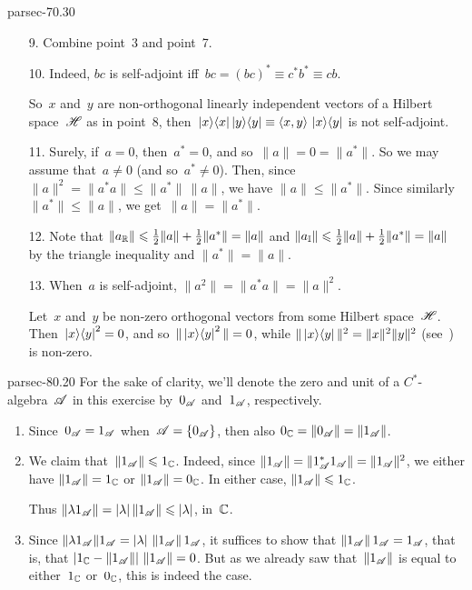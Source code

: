 \documentclass[b5page]{book}
\begin{document}
\begin{solution}{parsec-70.30}
\begin{enumerate}
\item[9.]
Combine point~3 and point~7.

\item[10.]
Indeed, $bc$ is self-adjoint
iff~$bc=(bc)^*\equiv c^*b^*\equiv cb$.

So~$x$ and~$y$ are non-orthogonal linearly independent vectors
of a Hilbert space~$\mathscr{H}$ as in point~8,
then~$\left|x\right>\!\left<x\right|\left|y\right>\!\left<y\right|\equiv \left<x,y\right>\,\left|x\right>\!\left<y\right|$
is not self-adjoint.

\item[11.]
Surely, if~$a=0$,
then~$a^*=0$, and so~$\|a\|=0=\|a^*\|$.
So we may assume that~$a\neq 0$
(and so~$a^*\neq 0$).
Then, since~$\|a\|^2=\|a^*a\|\leq \|a^*\|\,\|a\|$,
we have $\|a\|\leq \|a^*\|$.
Since similarly $\|a^*\|\leq \|a\|$,
we get~$\|a\|=\|a^*\|$.

\item[12.]
Note that
$\|a_{\mathbb{R}}\|\leqslant
\frac{1}{2}\|a\|+\frac{1}{2}\|a^*\|
= \|a\|$
and $\|a_{\mathbb{I}}\|\leqslant
\frac{1}{2}\|a\| + \frac{1}{2}\|a^*\|
= \|a\|$
by the triangle inequality and $\|a^*\|=\|a\|$.

\item[13.]
When~$a$ is self-adjoint,
$\|a^2\| = \|a^*a\| = \|a\|^2$.

Let~$x$ and~$y$ be non-zero orthogonal vectors
from some Hilbert space~$\mathscr{H}$.
Then~$\left|x\right>\!\left<y\right|^2 = 0$, and so~$\|\left|x\right>\!\left<y\right|^2\|=0$,
while $\|\left|x\right>\!\left<y\right|\|^2 = \|x\|^2\|y\|^2$
(see~) is non-zero.
\end{enumerate}
\end{solution}
\begin{solution}{parsec-80.20}
For the sake of clarity,
we'll denote the zero and unit of a $C^*$-algebra~$\mathscr{A}$
in this exercise
by~$0_{\mathscr{A}}$ and~$1_{\mathscr{A}}$, respectively.
\begin{enumerate}
\item
Since~$0_{\mathscr{A}}=1_{\mathscr{A}}$ when~$\mathscr{A}=\{0_{\mathscr{A}}\}$,
then also $0_{\mathbb{C}}=\|0_{\mathscr{A}}\|=\|1_{\mathscr{A}}\|$.
\item
We claim that~$\|1_{\mathscr{A}}\|\leqslant 1_{\mathbb{C}}$.
Indeed, since $\|1_{\mathscr{A}}\|=\|1_{\mathscr{A}}^*1_{\mathscr{A}}\|=\|1_{\mathscr{A}}\|^2$,
we either have $\|1_{\mathscr{A}}\|=1_{\mathbb{C}}$
        or $\|1_{\mathscr{A}}\|=0_{\mathbb{C}}$.
        In either case, $\|1_{\mathscr{A}}\|\leqslant 1_{\mathbb{C}}$.

Thus $\|\lambda 1_{\mathscr{A}}\| = \left|\lambda\right|\|1_{\mathscr{A}}\|\leqslant
        \left|\lambda\right|$, in~$\mathbb{C}$.
\item
Since $\|\lambda 1_{\mathscr{A}}\|1_{\mathscr{A}}
= \left|\lambda\right| \,\|1_{\mathscr{A}}\|\, 1_{\mathscr{A}}$,
it suffices to show that $\|1_{\mathscr{A}}\|\, 1_{\mathscr{A}} = 1_{\mathscr{A}}$,
        that is, that $\left| 1_{\mathbb{C}}-\|1_{\mathscr{A}}\|\right|\,\|1_{\mathscr{A}}\| =0$.
But as we already saw that~$\|1_{\mathscr{A}}\|$
is equal to either~$1_{\mathbb{C}}$ or~$0_{\mathbb{C}}$,
this is indeed the case.
\end{enumerate}
\end{solution}
\end{document}

